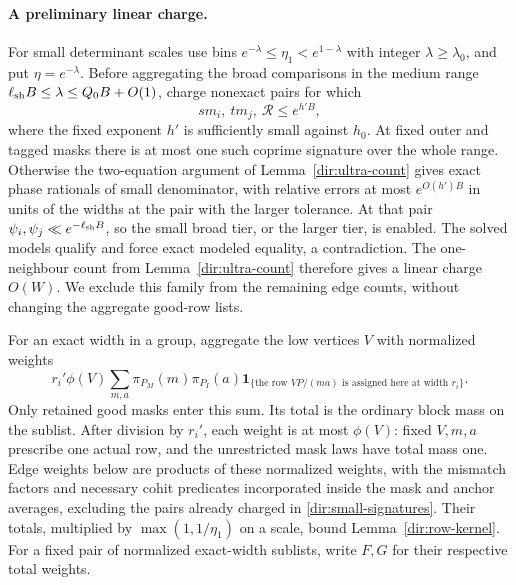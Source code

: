 \paragraph{A preliminary linear charge.}
For small determinant scales use bins
$e^{-\lambda}\le\eta_1<e^{1-\lambda}$ with integer
$\lambda\ge\lambda_0$, and put $\eta=e^{-\lambda}$.
Before aggregating the broad comparisons in the medium range
$\ell_{\rm sh}B\le\lambda\le Q_0B+O(1)$, charge nonexact pairs for which
\begin{equation}\label{dir:small-signatures}
 s m_i,\ t m_j,\ \mathcal R\le e^{h'B},
\end{equation}
where the fixed exponent $h'$ is sufficiently small against $h_0$.
At fixed outer and tagged masks there is at most one such coprime
signature over the whole range. Otherwise the two-equation argument
of Lemma~\ref{dir:ultra-count} gives exact phase rationals of small
denominator, with relative errors at most $e^{O(h')B}$ in units of
the widths at the pair with the larger tolerance. At that pair
$\psi_i,\psi_j\ll e^{-\ell_{\rm sh}B}$, so the small broad tier, or
the larger tier, is enabled. The solved models qualify and force
exact modeled equality, a contradiction. The one-neighbour count
from Lemma~\ref{dir:ultra-count} therefore gives a linear charge
$O(W)$. We exclude this family from the remaining edge counts,
without changing the aggregate good-row lists.

For an exact width in a group, aggregate the low vertices $V$ with
normalized weights
\begin{equation}\label{dir:aggregate-vertices}
 r_i'\phi(V)\sum_{m,a}\pi_{P_M}(m)\pi_{P_I}(a)
 \mathbf1_{\{\text{the row }VP/(ma)\text{ is assigned here at width }r_i\}}.
\end{equation}
Only retained good masks enter this sum. Its total is the ordinary
block mass on the sublist. After division by $r_i'$, each weight is
at most $\phi(V)$: fixed $V,m,a$ prescribe one actual row, and the
unrestricted mask laws have total mass one. Edge weights below are
products of these normalized weights, with the mismatch factors and
necessary cohit predicates incorporated inside the mask and anchor
averages, excluding the pairs already charged in
\eqref{dir:small-signatures}. Their totals, multiplied by
$\max(1,1/\eta_1)$ on a scale,
bound Lemma~\ref{dir:row-kernel}.
For a fixed pair of normalized exact-width sublists, write $F,G$ for
their respective total weights.

